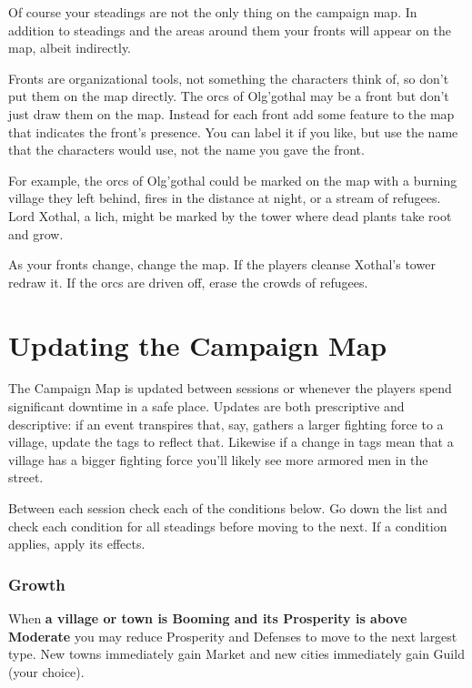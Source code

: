 Of course your steadings are not the only thing on the campaign map. In addition to steadings and the areas around them your fronts will appear on the map, albeit indirectly.

       

Fronts are organizational tools, not something the characters think of, so don't put them on the map directly. The orcs of Olg'gothal may be a front but don't just draw them on the map. Instead for each front add some feature to the map that indicates the front's presence. You can label it if you like, but use the name that the characters would use, not the name you gave the front.

       

For example, the orcs of Olg'gothal could be marked on the map with a burning village they left behind, fires in the distance at night, or a stream of refugees. Lord Xothal, a lich, might be marked by the tower where dead plants take root and grow.

       

As your fronts change, change the map. If the players cleanse Xothal's tower redraw it. If the orcs are driven off, erase the crowds of refugees.

       
\section{Updating the Campaign Map}    
       

The Campaign Map is updated between sessions or whenever the players spend significant downtime in a safe place. Updates are both prescriptive and descriptive: if an event transpires that, say, gathers a larger fighting force to a village, update the tags to reflect that. Likewise if a change in tags mean that a village has a bigger fighting force you'll likely see more armored men in the street.

       

Between each session check each of the conditions below. Go down the list and check each condition for all steadings before moving to the next. If a condition applies, apply its effects.

       
\subsubsection{Growth}   
       

When {\bf a village or town is Booming and its Prosperity is above Moderate}  you may reduce Prosperity and Defenses to move to the next largest type. New towns immediately gain Market and new cities immediately gain Guild (your choice).

